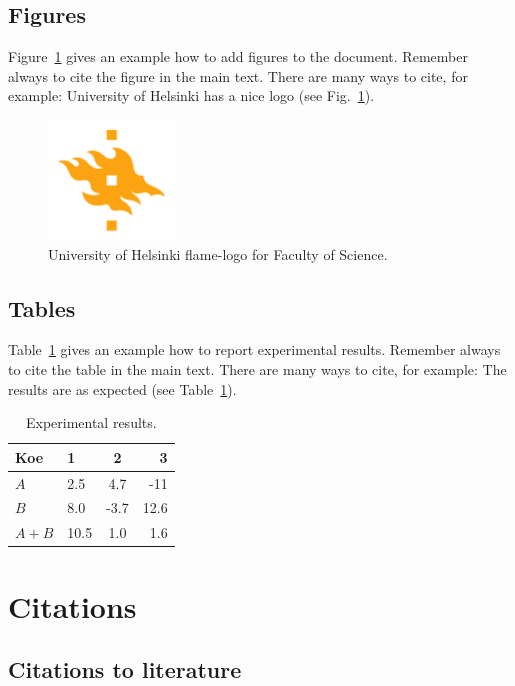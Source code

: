 \documentclass[english,twoside,openright]{HYgraduMLDS}
\begin{document}
\section{Figures}
Figure~\ref{fig:logo} gives an example how to add figures to the document. Remember always to cite the figure in the main text. There are many ways to cite, for example: University of Helsinki has a nice logo (see Fig.~\ref{fig:logo}).
\begin{figure}[h!] 
\centering 
\includegraphics[width=0.3\textwidth]{HY-logo-ml.png}
\caption{University of Helsinki flame-logo for Faculty of Science.\label{fig:logo}}
\end{figure}

\section{Tables}

Table~\ref{table:results} gives an example how to report experimental results. Remember always to cite the table in the main text. There are many ways to cite, for example: The results are as expected (see Table~\ref{table:results}).

\begin{table}
\centering
\caption{Experimental results.\label{table:results}}
\begin{tabular}{l||l c r} 
Koe & 1 & 2 & 3 \\ 
\hline \hline 
$A$ & 2.5 & 4.7 & -11 \\
$B$ & 8.0 & -3.7 & 12.6 \\
$A+B$ & 10.5 & 1.0 & 1.6 \\
\hline
%
\end{tabular}
\end{table}

\chapter{Citations}

\section{Citations to literature}
\end{document}
